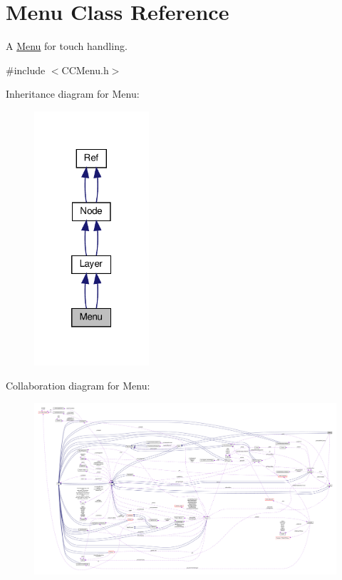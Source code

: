 \hypertarget{classMenu}{}\section{Menu Class Reference}
\label{classMenu}


A \hyperlink{classMenu}{Menu} for touch handling.  




{\ttfamily \#include $<$C\+C\+Menu.\+h$>$}



Inheritance diagram for Menu\+:
\nopagebreak
\begin{figure}[H]
\begin{center}
\leavevmode
\includegraphics[width=121pt]{classMenu__inherit__graph}
\end{center}
\end{figure}


Collaboration diagram for Menu\+:
\nopagebreak
\begin{figure}[H]
\begin{center}
\leavevmode
\includegraphics[width=350pt]{classMenu__coll__graph}
\end{center}
\end{figure}
